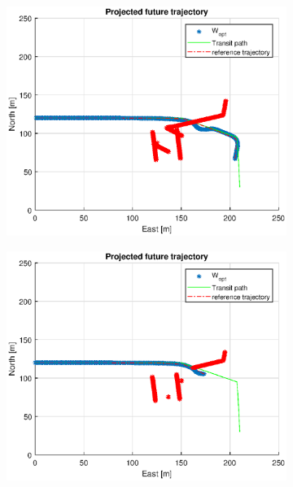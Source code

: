 \begin{figure}
\begin{subfigure}[b]{0.499\textwidth}
    \end{subfigure}
    \hfill
    \\
    \begin{subfigure}[b]{0.49\textwidth}
        \centering
        \includegraphics[width=\textwidth]{Images/Figures/Havn1/Simple0_f999_Frame3}
    \end{subfigure}
    \hfill
    \begin{subfigure}[b]{0.499\textwidth}
        \centering
        \includegraphics[width=\textwidth]{Images/Figures/Havn1/Simple0_f999_Frame4}

\end{subfigure}
\end{figure}
